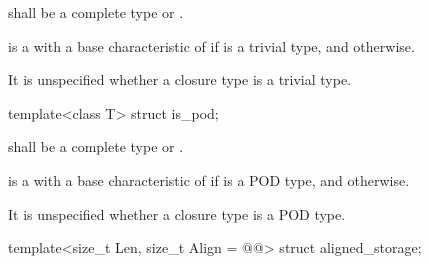\begin{itemdescr}
\pnum
\expects
{} shall be a complete type or \cv{} .

\pnum
\remarks
{} is a 
with a base characteristic of 
if  is a trivial type,
and  otherwise.

\pnum
\begin{note}
It is unspecified
whether a closure type is a trivial type.
\end{note}
\end{itemdescr}

%
\begin{itemdecl}
template<class T> struct is_pod;
\end{itemdecl}

\begin{itemdescr}
\pnum
\expects
{} shall be a complete type or \cv{} .

\pnum
\remarks
{} is a 
with a base characteristic of 
if  is a POD type,
and  otherwise.

\pnum
\begin{note}
It is unspecified whether a closure type is a POD type.
\end{note}
\end{itemdescr}

%
\begin{itemdecl}
template<size_t Len, size_t Align = @@>
  struct aligned_storage;
\end{itemdecl}


